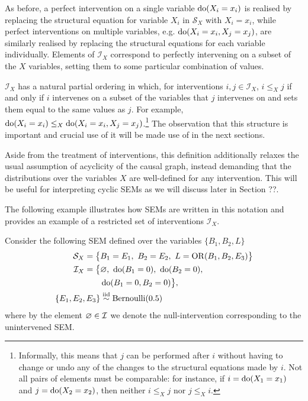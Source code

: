 As before, a perfect intervention on a single variable $\operatorname{do}(X_i=x_i)$ is realised by replacing the structural equation for variable $X_i$ in $\mathcal{S}_X$ with $X_i = x_i$,
while perfect interventions on multiple variables, e.g. $\operatorname{do}(X_i=x_i, X_j=x_j)$, are similarly realised by replacing the structural equations for each variable individually.
Elements of $\mathcal{I}_X$ correspond to perfectly intervening on a subset of the $X$ variables, setting them to some particular combination of values.

$\mathcal{I}_X$ has a natural partial ordering in which, for interventions ${i, j \in \mathcal{I}_X}$, ${i\leq_X j}$ if and only if $i$ intervenes on a subset of the variables that $j$ intervenes on and sets them equal to the same values as $j$.
For example, ${\operatorname{do}(X_i=x_i) \leq_X \operatorname{do}(X_i=x_i, X_j=x_j)}$.\footnote{Informally, this means that $j$ can be performed after $i$ without having to change or undo any of the changes to the structural equations made by $i$.
Not all pairs of elements must be comparable: for instance, if $i= \operatorname{do}(X_1=x_1)$ and $j = \operatorname{do}(X_2=x_2)$, then neither $i\leq_X j$ nor $j \leq_X i$.} The observation that this structure is important and crucial use of it will be made use of in the next sections.

Aside from the treatment of interventions, this definition additionally relaxes the usual assumption of acyclicity of the causal graph, instead demanding that the distributions over the variables $X$ are well-defined for any intervention.
This will be useful for interpreting cyclic SEMs as we will discuss later in Section ??.

The following example illustrates how SEMs are written in this notation and provides an example of a restricted set of interventions $\mathcal{I}_X$.

\begin{example}\label{example1}
Consider the following SEM defined over the variables $\{ B_1,B_2,L \}$
%
\begin{align*}
\mathcal{S}_X = \big\{ & B_1 = E_1,\ B_2 = E_2,\ L = \operatorname{OR}(B_1,B_2,E_3) \big\} \\
%
\mathcal{I}_X = \big\{ & \nulli,\ \doop(B_1=0),\ \doop(B_2=0),\\
& \doop(B_1=0,B_2=0) \big\}, \\
%
\{ E_1,E_2,E_3 \} & \overset{\text{iid}}{\sim} \mathrm{Bernoulli}(0.5)
\end{align*}
%
where by the element $\varnothing \in \mathcal{I}$ we denote the null-intervention corresponding to the unintervened SEM\@.
\end{example}

